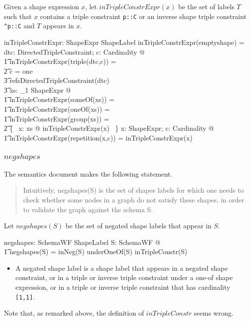 \documentclass{article}
\begin{document}
Given a shape expression $x$, let $inTripleConstrExpr(x)$ be the set of labels $T$ such that $x$ contains a triple constraint 
{\tt p::C} or an inverse shape triple constraint {\tt \verb+^+p::C} and $T$ appears in $x$.
\begin{axdef}
	inTripleConstrExpr: ShapeExpr \fun \finset ShapeLabel
\where
	inTripleConstrExpr(emptyshape) = \emptyset
\also
	\forall dtc: DirectedTripleConstraint; c: Cardinality @ \\
\t1		inTripleConstrExpr(triple(dtc,c)) = \\
\t2			\IF c = one \\
\t3				\THEN refsDirectedTripleConstraint(dtc) \\
\t3				\ELSE \emptyset
\also
	\forall xs: \seq_1 ShapeExpr @ \\
\t1		inTripleConstrExpr(someOf(xs)) = \\
\t1		inTripleConstrExpr(oneOf(xs)) = \\
\t1		inTripleConstrExpr(group(xs)) = \\
\t2			\bigcup \{~ x: \ran xs @ inTripleConstrExpr(x) ~\}
\also
	\forall x: ShapeExpr; c: Cardinality @ \\
\t1		inTripleConstrExpr(repetition(x,c)) = inTripleConstrExpr(x)
\end{axdef}

\subsubsection{$negshapes$}
The semantics document makes the following statement.
\begin{quote}
Intuitively, negshapes(S) is the set of shapes labels for which one needs to check whether some nodes in a graph do not satisfy these shapes, in order to validate the graph against the schema S.
\end{quote}

Let $negshapes(S)$ be the set of negated shape labels that appear in $S$.
\begin{axdef}
	negshapes: SchemaWF \fun \finset ShapeLabel
\where
	\forall S: SchemaWF @ \\
\t1		negshapes(S) = inNeg(S) \cup underOneOf(S) \cup inTripleConstr(S)
\end{axdef}
\begin{itemize}
\item A negated shape label is a shape label that appears in a negated shape constraint, or in a triple or inverse triple constraint under a one-of shape expression, or in a triple or inverse triple constraint that has cardinality {\tt [1,1]}.
\end{itemize}
Note that, as remarked above, the definition of $inTripleConstr$ seems wrong.
\end{document}
